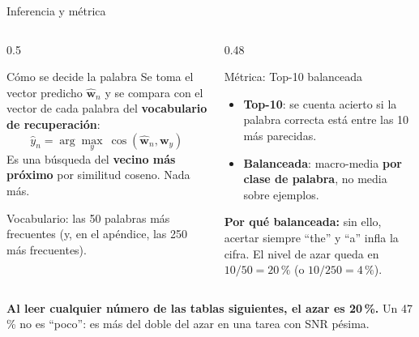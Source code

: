 \documentclass[aspectratio=169,10pt]{beamer}
\newcommand{\term}[1]{\textbf{\color{deepgreen}#1}}
\begin{document}
\begin{frame}[c]{Inferencia y métrica}
  \small
  \begin{columns}[t,totalwidth=\linewidth]
    \begin{column}{0.5\linewidth}
      \begin{block}{Cómo se decide la palabra}
        Se toma el vector predicho $\hat{\mathbf{w}}_n$ y se compara con el vector de cada palabra del \term{vocabulario de recuperación}:
        \[ \hat{y}_n = \arg\max_{y}\ \cos(\hat{\mathbf{w}}_n, \mathbf{w}_y) \]
        Es una búsqueda del \term{vecino más próximo} por similitud coseno. Nada más.
      \end{block}
      \vspace{1mm}
      {\footnotesize Vocabulario: las 50 palabras más frecuentes (y, en el apéndice, las 250 más frecuentes).}
    \end{column}
    \begin{column}{0.48\linewidth}
      \begin{alertblock}{Métrica: Top-10 balanceada}
        \begin{itemize}\footnotesize
          \item \term{Top-10}: se cuenta acierto si la palabra correcta está entre las 10 más parecidas.
          \item \term{Balanceada}: macro-media \term{por clase de palabra}, no media sobre ejemplos.
        \end{itemize}
        \vspace{1mm}
        \footnotesize \term{Por qué balanceada:} sin ello, acertar siempre ``the'' y ``a'' infla la cifra. El nivel de azar queda en $10/50 = 20\,\%$ (o $10/250 = 4\,\%$).
      \end{alertblock}
    \end{column}
  \end{columns}
  \vspace{2mm}
  \centering\small
  \term{Al leer cualquier número de las tablas siguientes, el azar es 20\,\%.} Un 47\,\% no es ``poco'': es más del doble del azar en una tarea con SNR pésima.
\end{frame}
\end{document}
